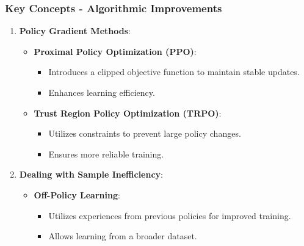 \documentclass{beamer}
\begin{document}
\begin{frame}[fragile]
    \frametitle{Key Concepts - Algorithmic Improvements}
    \begin{enumerate}
        \item \textbf{Policy Gradient Methods}:
        \begin{itemize}
            \item \textbf{Proximal Policy Optimization (PPO)}:
                \begin{itemize}
                    \item Introduces a clipped objective function to maintain stable updates.
                    \item Enhances learning efficiency.
                \end{itemize}
            \item \textbf{Trust Region Policy Optimization (TRPO)}:
                \begin{itemize}
                    \item Utilizes constraints to prevent large policy changes.
                    \item Ensures more reliable training.
                \end{itemize}
        \end{itemize}

        \item \textbf{Dealing with Sample Inefficiency}:
        \begin{itemize}
            \item \textbf{Off-Policy Learning}:
                \begin{itemize}
                    \item Utilizes experiences from previous policies for improved training.
                    \item Allows learning from a broader dataset.
                \end{itemize}
        \end{itemize}
    \end{enumerate}
\end{frame}
\end{document}
